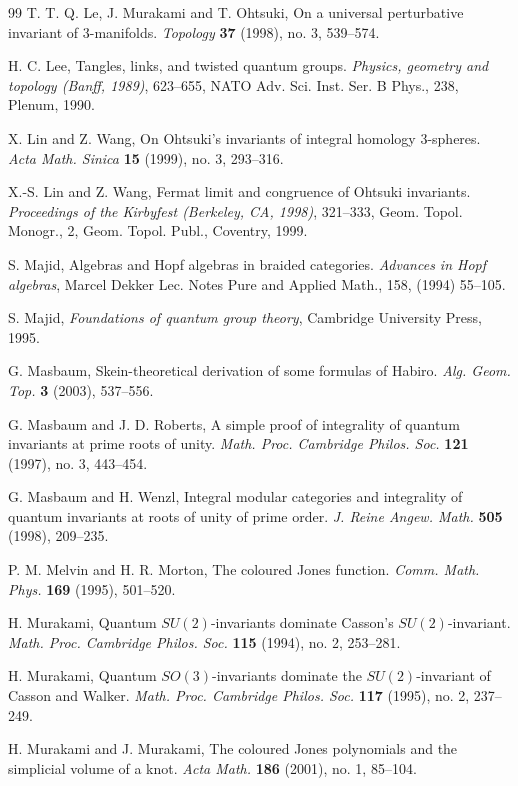 \documentclass{amsart}
\numberwithin{equation}{section}
\numberwithin{figure}{section}
\theoremstyle{plain}
\theoremstyle{definition}
\theoremstyle{remark}
\begin{document}
\begin{thebibliography}{99}
T. T. Q. Le, J. Murakami and T. Ohtsuki,
On a universal perturbative invariant of $3$-manifolds.
{\it Topology} {\bf 37} (1998), no. 3, 539--574.

H. C. Lee,
Tangles, links, and twisted quantum groups.
{\it Physics, geometry and topology (Banff, 1989)}, 623--655, NATO Adv. Sci. Inst. Ser. B Phys., 238, Plenum, 1990.

X. Lin and Z. Wang,
On Ohtsuki's invariants of integral homology 3-spheres.
{\it Acta Math. Sinica} {\bf 15} (1999), no. 3, 293--316.

 X.-S. Lin and Z. Wang, Fermat limit and congruence
of Ohtsuki invariants.  {\it Proceedings of the Kirbyfest (Berkeley,
CA, 1998)}, 321--333, Geom. Topol. Monogr., 2, Geom. Topol. Publ.,
Coventry, 1999.

S. Majid,
Algebras and Hopf algebras in braided categories.
{\it Advances in Hopf algebras}, Marcel Dekker
  Lec. Notes Pure and Applied Math., 158, (1994) 55--105.

S. Majid,
{\it Foundations of quantum group theory},
Cambridge University Press, 1995.

G. Masbaum,
Skein-theoretical derivation of some formulas of Habiro.
{\it Alg. Geom. Top.} {\bf 3} (2003), 537--556.

G. Masbaum and J. D. Roberts,
A simple proof of integrality of quantum invariants at prime roots of unity.
{\it Math. Proc. Cambridge Philos. Soc.}  {\bf 121} (1997), no. 3, 443--454.

G. Masbaum and H. Wenzl,
Integral modular categories and integrality of quantum invariants at roots of unity of prime order.
{\it J. Reine Angew. Math.} {\bf 505} (1998), 209--235.

P. M. Melvin and H. R. Morton,
The coloured Jones function.
{\it Comm. Math. Phys.} {\bf 169} (1995), 501--520.

H. Murakami,
Quantum $SU(2)$-invariants dominate Casson's $SU(2)$-invariant.
{\it Math. Proc. Cambridge Philos. Soc.}  {\bf 115} (1994), no. 2, 253--281.

H. Murakami,
Quantum $SO(3)$-invariants dominate the $SU(2)$-invariant of Casson and Walker.
{\it Math. Proc. Cambridge Philos. Soc.} {\bf 117} (1995), no. 2, 237--249.

H. Murakami and J. Murakami,
The coloured Jones polynomials and the simplicial volume of a knot.
{\it Acta Math.} {\bf 186} (2001), no. 1, 85--104.


\end{thebibliography}
\end{document}
